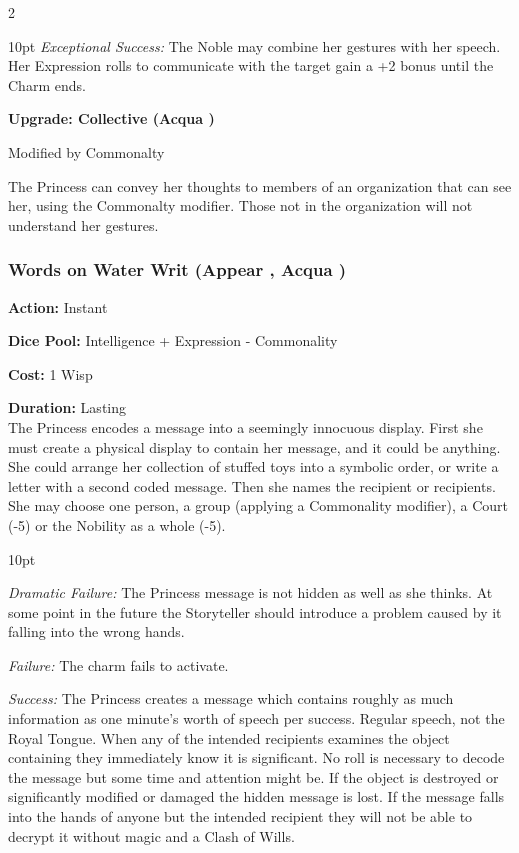 \begin{multicols}{2}
\begin{myindentpar}{10pt}
\emph{Exceptional Success:}  The Noble may combine her gestures with her speech. Her Expression rolls to communicate with the target gain a +2 bonus until the Charm ends.

\textbf{Upgrade: Collective (Acqua \textbullet\textbullet)}

Modified by Commonalty

The Princess can convey her thoughts to members of an organization that can see her, using the Commonalty modifier. Those not in the organization will not understand her gestures.\end{myindentpar}  

\subsubsection*{Words on Water Writ (Appear \textbullet\textbullet, Acqua \textbullet)}

\noindent \textbf{Action:} Instant

\noindent \textbf{Dice Pool:} Intelligence + Expression - Commonality

\noindent \textbf{Cost:} 1 Wisp

\noindent \textbf{Duration:} Lasting\\

\noindent The Princess encodes a message into a seemingly innocuous display. First she must create a physical display to contain her message, and it could be anything. She could arrange her collection of stuffed toys into a symbolic order, or write a letter with a second coded message. Then she names the recipient or recipients. She may choose one person, a group (applying a Commonality modifier), a Court (-5) or the Nobility as a whole (-5). 

\begin{myindentpar}{10pt}

\emph{Dramatic Failure:} The Princess message is not hidden as well as she thinks. At some point in the future the Storyteller should introduce a problem caused by it falling into the wrong hands. 

\emph{Failure:} The charm fails to activate.

\emph{Success:} The Princess creates a message which contains roughly as much information as one minute's worth of speech per success. Regular speech, not the Royal Tongue. When any of the intended recipients examines the object containing they immediately know it is significant. No roll is necessary to decode the message but some time and attention might be. If the object is destroyed or significantly modified or damaged the hidden message is lost. If the message falls into the hands of anyone but the intended recipient they will not be able to decrypt it without magic and a Clash of Wills.  


\end{myindentpar}
\end{multicols}
